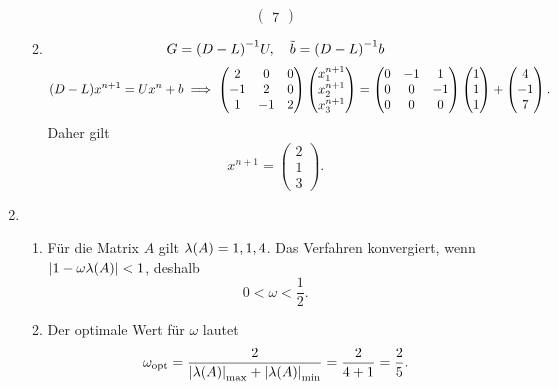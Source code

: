 \documentclass{exercise}
\begin{document}
\begin{enumerate}
\begin{enumerate}
\[\begin{pmatrix}
                    7
                \end{pmatrix}
            \]
            \item
            \[
                G = \parentheses*{D - L}^{-1}U, \quad \tilde{b} = \parentheses*{D - L}^{-1}b
            \]
            \[
                \parentheses*{D - L}x^{n + 1} = Ux^n + b \implies \begin{pmatrix}
                    2 & 0 & 0\\
                    -1 & 2 & 0\\
                    1 & -1 & 2
                \end{pmatrix}\begin{pmatrix}
                    x_1^{n + 1}\\
                    x_2^{n + 1}\\
                    x_3^{n + 1}
                \end{pmatrix} = \begin{pmatrix}
                    0 & -1 & 1\\
                    0 & 0 & -1\\
                    0 & 0 & 0
                \end{pmatrix}\begin{pmatrix}
                    1\\
                    1\\
                    1
                \end{pmatrix} + \begin{pmatrix}
                    4\\
                    -1\\
                    7
                \end{pmatrix}.
            \]
            Daher gilt
            \[
                x^{n + 1} = \begin{pmatrix}
                    2\\
                    1\\
                    3
                \end{pmatrix}.
            \]
        \end{enumerate}
        \item
        \begin{enumerate}
            \item Für die Matrix \(A\) gilt \(\lambda\parentheses*{A} = 1, 1, 4\).
            Das Verfahren konvergiert, wenn \(\absolute*{1 - \omega\lambda\parentheses*{A}} < 1\), deshalb
            \[
                0 < \omega < \frac{1}{2}.
            \]
            \item Der optimale Wert für \(\omega\) lautet
            \[
                \omega_{\text{opt}} = \frac{2}{\absolute*{\lambda\parentheses*{A}}_{\text{max}} + \absolute*{\lambda\parentheses*{A}}_{\text{min}}} = \frac{2}{4 + 1} = \frac{2}{5}.
            \]
        \end{enumerate}
    \end{enumerate}
\end{document}
